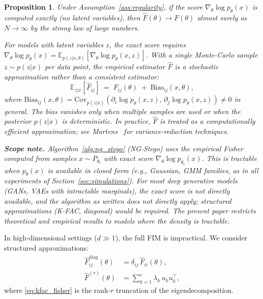 \documentclass[a4paper,fleqn]{cas-dc}
\newtheorem{proposition}{Proposition}
\newcommand{\E}{\mathbb{E}}
\begin{document}
\begin{proposition}%
  \label{prop:empirical_fisher_consistency}
  Under Assumption~\ref{ass:regularity}, if the score
  $\nabla_\theta \log p_\theta(x)$ is computed \emph{exactly}
  (no latent variables), then $\widehat{F}(\theta)\to F(\theta)$
  almost surely as $N\to\infty$ by the strong law of large numbers.

  For models with latent variables $z$, the exact score requires
  $\nabla_\theta \log p_\theta(x) =
  \E_{p(z|x,\theta)}[\nabla_\theta \log p_\theta(x,z)]$.
  With a \emph{single} Monte-Carlo sample $z\sim p(z|x)$ per data point,
  the empirical estimator $\widehat{F}$ is a \emph{stochastic approximation}
  rather than a consistent estimator:
  \[
    \E_{z|x}[\widehat{F}_{ij}] \;=\;
    F_{ij}(\theta) \;+\; \mathrm{Bias}_{ij}(x,\theta),
  \]
  where $\mathrm{Bias}_{ij}(x,\theta) =
  \mathrm{Cov}_{p(z|x)}(\partial_i\log p_\theta(x,z),\,
  \partial_j\log p_\theta(x,z)) \neq 0$ in general.
  The bias vanishes only when multiple samples are used or when the
  posterior $p(z|x)$ is deterministic.  In practice, $\widehat{F}$ is
  treated as a computationally efficient approximation; see
  Martens~\cite{martens2015optimizing} for variance-reduction techniques.

  \textbf{Scope note.}
  Algorithm~\ref{alg:ng_stego} (NG-Stego) uses the empirical Fisher
  computed from samples $x \sim P_{\theta_t}$ with exact score
  $\nabla_\theta \log p_{\theta_t}(x)$.  This is tractable when
  $p_\theta(x)$ is available in closed form (e.g., Gaussian, GMM
  families, as in all experiments of Section~\ref{sec:simulations}).
  For most deep generative models (GANs, VAEs with intractable
  marginals), the exact score is not directly available, and the
  algorithm as written does \emph{not} directly apply; structured
  approximations (K-FAC, diagonal) would be required.
  The present paper restricts theoretical and empirical results to
  models where the density is tractable.
\end{proposition}

In high-dimensional settings ($d\gg 1$), the full FIM is impractical.
We consider structured approximations:
\begin{align}
  \widehat{F}^{\mathrm{diag}}_{ij}(\theta)
  &= \delta_{ij}\,\widehat{F}_{ii}(\theta), \label{eq:diag_fisher} \\
  \widehat{F}^{(r)}(\theta)
  &= \sum_{k=1}^r \lambda_k\,u_k u_k^\top, \label{eq:kfac_fisher}
\end{align}
where \eqref{eq:kfac_fisher} is the rank-$r$ truncation of the eigendecomposition.
\end{document}
